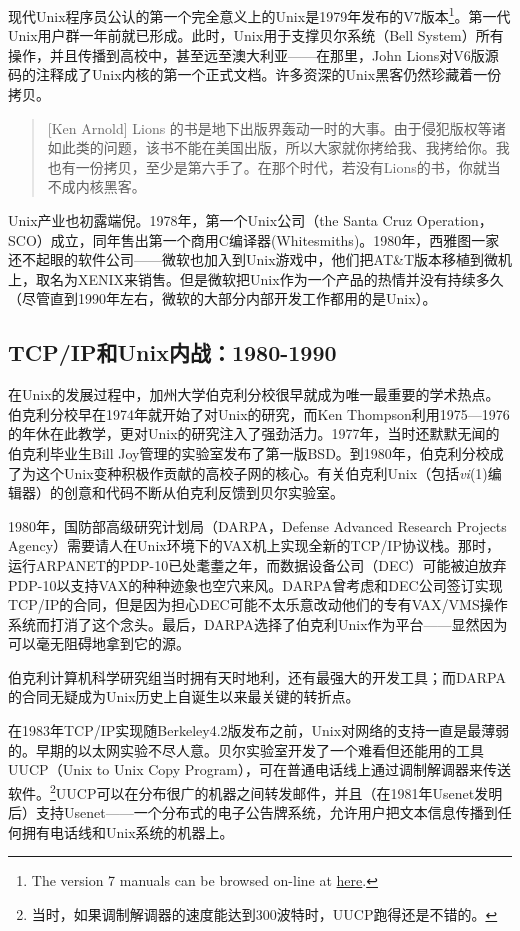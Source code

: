 \documentclass[12pt,oneside]{book}
\begin{document}
现代Unix程序员公认的第一个完全意义上的Unix是1979年发布的V7版本\footnote{The version 7 manuals can be browsed on-line at \href{http://plan9.bell-labs.com/7thEdMan/index.html}{here}.}。第一代Unix用户群一年前就已形成。此时，Unix用于支撑贝尔系统（Bell System）所有操作\cite{Hauben}，并且传播到高校中，甚至远至澳大利亚——在那里，John Lions对V6版源码的注释\cite{Lions}成了Unix内核的第一个正式文档。许多资深的Unix黑客仍然珍藏着一份拷贝。

\begin{quote}[Ken Arnold]
Lions 的书是地下出版界轰动一时的大事。由于侵犯版权等诸如此类的问题，该书不能在美国出版，所以大家就你拷给我、我拷给你。我也有一份拷贝，至少是第六手了。在那个时代，若没有Lions的书，你就当不成内核黑客。
\end{quote}

Unix产业也初露端倪。1978年，第一个Unix公司（the Santa Cruz Operation，SCO）成立，同年售出第一个商用C编译器(Whitesmiths)。1980年，西雅图一家还不起眼的软件公司——微软也加入到Unix游戏中，他们把AT\&{}T版本移植到微机上，取名为XENIX来销售。但是微软把Unix作为一个产品的热情并没有持续多久（尽管直到1990年左右，微软的大部分内部开发工作都用的是Unix）。

\subsection{TCP/IP和Unix内战：1980-1990}
在Unix的发展过程中，加州大学伯克利分校很早就成为唯一最重要的学术热点。伯克利分校早在1974年就开始了对Unix的研究，而Ken Thompson利用1975—1976的年休在此教学，更对Unix的研究注入了强劲活力。1977年，当时还默默无闻的伯克利毕业生Bill Joy管理的实验室发布了第一版BSD。到1980年，伯克利分校成了为这个Unix变种积极作贡献的高校子网的核心。有关伯克利Unix（包括\textit{vi}(1)编辑器）的创意和代码不断从伯克利反馈到贝尔实验室。

1980年，国防部高级研究计划局（DARPA，Defense Advanced Research Projects Agency）需要请人在Unix环境下的VAX机上实现全新的TCP/IP协议栈。那时，运行ARPANET的PDP-10已处耄耋之年，而数据设备公司（DEC）可能被迫放弃PDP-10以支持VAX的种种迹象也空穴来风。DARPA曾考虑和DEC公司签订实现TCP/IP的合同，但是因为担心DEC可能不太乐意改动他们的专有VAX/VMS操作系统\cite{Libes-Ressler}而打消了这个念头。最后，DARPA选择了伯克利Unix作为平台——显然因为可以毫无阻碍地拿到它的源\cite{Leonard}。

伯克利计算机科学研究组当时拥有天时地利，还有最强大的开发工具；而DARPA的合同无疑成为Unix历史上自诞生以来最关键的转折点。

在1983年TCP/IP实现随Berkeley4.2版发布之前，Unix对网络的支持一直是最薄弱的。早期的以太网实验不尽人意。贝尔实验室开发了一个难看但还能用的工具UUCP（Unix to Unix Copy Program），可在普通电话线上通过调制解调器来传送软件。\footnote{当时，如果调制解调器的速度能达到300波特时，UUCP跑得还是不错的。}UUCP可以在分布很广的机器之间转发邮件，并且（在1981年Usenet发明后）支持Usenet——一个分布式的电子公告牌系统，允许用户把文本信息传播到任何拥有电话线和Unix系统的机器上。
\end{document}
